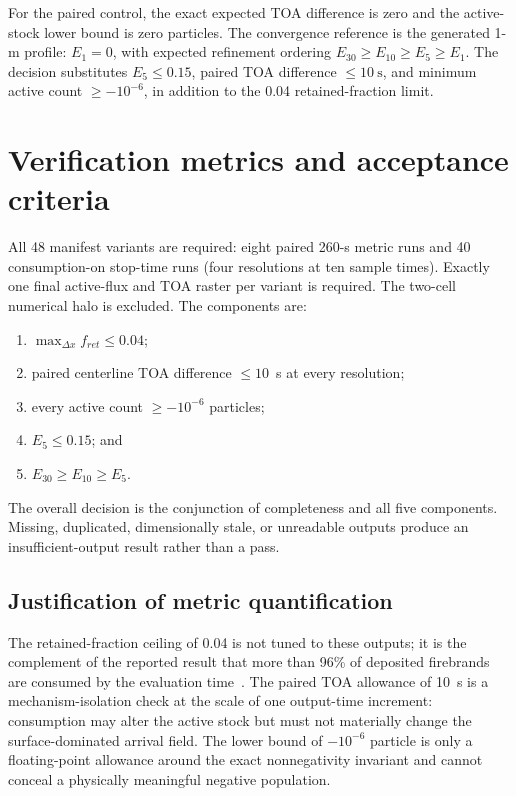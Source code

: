 For the paired control, the exact expected TOA difference is zero and the
active-stock lower bound is zero particles.  The convergence reference is the
generated 1-m profile:
\(E_1=0\), with expected refinement ordering
\(E_{30}\geq E_{10}\geq E_5\geq E_1\).
The decision substitutes \(E_5\leq0.15\), paired TOA difference
\(\leq10~\mathrm{s}\), and minimum active count
\(\geq-10^{-6}\), in addition to the 0.04 retained-fraction limit.

\section{Verification metrics and acceptance criteria}
All 48 manifest variants are required: eight paired 260-s metric runs and 40
consumption-on stop-time runs (four resolutions at ten sample times). Exactly
one final active-flux and TOA raster per variant is required. The two-cell numerical halo is excluded. The components
are:
\begin{enumerate}
 \item \(\max_{\Delta x} f_{ret}\le0.04\);
 \item paired centerline TOA difference \(\le10\)~s at every resolution;
 \item every active count \(\ge-10^{-6}\) particles;
 \item \(E_5\le0.15\); and
 \item \(E_{30}\ge E_{10}\ge E_5\).
\end{enumerate}
The overall decision is the conjunction of completeness and all five
components. Missing, duplicated, dimensionally stale, or unreadable outputs
produce an insufficient-output result rather than a pass.

\subsection{Justification of metric quantification}

The retained-fraction ceiling of 0.04 is not tuned to these outputs; it is the
complement of the reported result that more than 96\% of deposited firebrands
are consumed by the evaluation time~\cite{Qin2025}.  The paired TOA allowance
of \SI{10}{s} is a mechanism-isolation check at the scale of one output-time
increment: consumption may alter the active stock but must not materially
change the surface-dominated arrival field.  The lower bound of
\(-10^{-6}\) particle is only a floating-point allowance around the exact
nonnegativity invariant and cannot conceal a physically meaningful negative
population.

